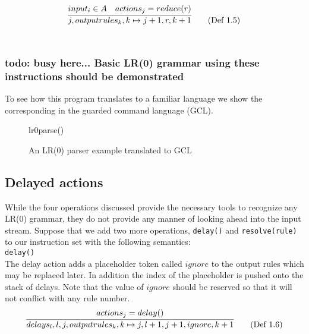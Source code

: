 \documentclass[11pt]{article}
\begin{document}
\begin{equation}
\infer{j, outputrules_k, k \mapsto j+1, r, k+1}{input_i \in A & actions_j = reduce(r)} \tag{Def 1.5}
\end{equation}\\


\subsubsection{todo: busy here... Basic LR(0) grammar using these instructions should be demonstrated}

To see how this program translates to a familiar language we show the corresponding in the guarded command language (GCL).

\begin{figure}[htbp]
\begin{center}
\begin{gcl}
\PROC lr0parse()
\CORP
\end{gcl}
\caption{An LR(0) parser example translated to GCL}
\end{center}
\end{figure}


\subsection{Delayed actions}
While the four operations discussed provide the necessary tools to recognize any LR(0) grammar, they do not provide any manner of looking ahead into the input stream.
Suppose that we add two more operations, \texttt{delay()} and \texttt{resolve(rule)} to our instruction set with the following semantics:\\

\texttt{delay()}\\
The delay action adds a placeholder token called $ignore$ to the output rules which may be replaced later.
In addition the index of the placeholder is pushed onto the stack of delays.
Note that the value of $ignore$ should be reserved so that it will not conflict with any rule number.
\begin{equation}
\infer{delays_l, l, j, outputrules_k, k \mapsto j, l+1, j+1, ignore, k+1}{actions_j = delay()} \tag{Def 1.6}
\end{equation}\\
\end{document}
